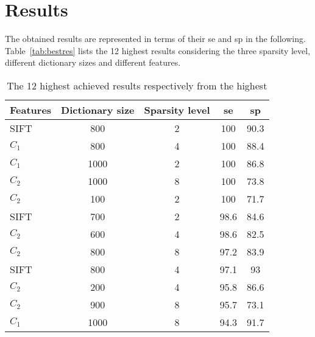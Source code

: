 \section{Results}
\label{sec:res}
The obtained results are represented in terms of their \ac{se} and \ac{sp} in the following. Table~\ref{tab:bestres} lists the 12 highest results considering the three sparsity level, different dictionary sizes and different features.
 
\begin{table}
\caption{The 12 highest achieved results respectively from the highest}
\centering
\begin{tabular}{l cccc}
\toprule
Features &  Dictionary size & Sparsity level & \ac{se} & \ac{sp}\\
\midrule
SIFT    & 800 & 2 & 100 & 90.3\\
$C_{1}$ & 800 & 4 & 100 & 88.4\\
$C_{1}$ & 1000 & 2 & 100 & 86.8\\
$C_{2}$ & 1000 & 8 & 100 & 73.8 \\
$C_{2}$ & 100 & 2 & 100 & 71.7 \\
SIFT    & 700 & 2 & 98.6 & 84.6 \\
$C_{2}$ & 600 & 4 & 98.6 & 82.5\\
$C_{2}$ & 800 & 8 & 97.2 & 83.9\\
SIFT    & 800 & 4 & 97.1 & 93 \\
$C_{2}$ & 200 & 4 & 95.8 & 86.6\\
$C_{2}$ & 900 & 8 & 95.7 & 73.1 \\
$C_{1}$ & 1000 & 8 & 94.3 & 91.7\\
\bottomrule
\end{tabular}
\label{tab:besres}
\end{table}

